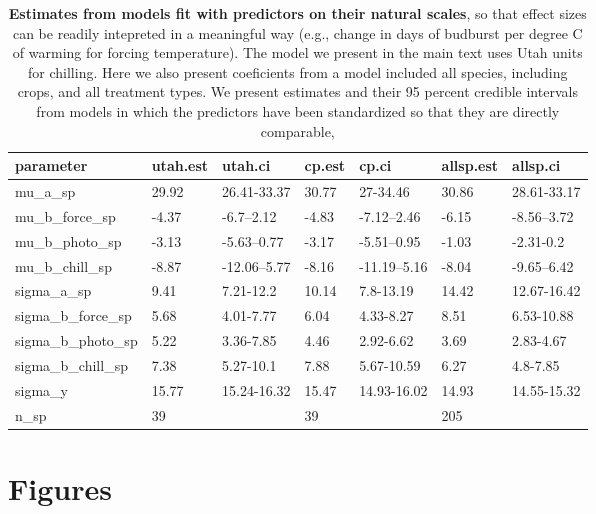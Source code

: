 \documentclass{article}
\begin{document}
\begin{table}[ht]
\centering
\caption{\textbf{Estimates from models fit with predictors on their natural scales},  so that effect sizes can be readily intepreted in a meaningful way (e.g., change in days of budburst per degree C of warming for forcing temperature). The model we present in the main text uses Utah units for chilling. Here we also present coeficients from a model included all species, including crops, and all treatment types. We present estimates and their 95 percent credible intervals from models in which the predictors have been standardized so that they are directly comparable,} 
\label{tab:methods}
\begingroup\footnotesize
\begin{tabular}{|p{}|p{}|p{}|p{}|p{}|p{}|p{}|}
  \hline
parameter & utah.est & utah.ci & cp.est & cp.ci & allsp.est & allsp.ci \\ 
  \hline
mu\_a\_sp & 29.92 & 26.41-33.37 & 30.77 & 27-34.46 & 30.86 & 28.61-33.17 \\ 
  mu\_b\_force\_sp & -4.37 & -6.7--2.12 & -4.83 & -7.12--2.46 & -6.15 & -8.56--3.72 \\ 
  mu\_b\_photo\_sp & -3.13 & -5.63--0.77 & -3.17 & -5.51--0.95 & -1.03 & -2.31-0.2 \\ 
  mu\_b\_chill\_sp & -8.87 & -12.06--5.77 & -8.16 & -11.19--5.16 & -8.04 & -9.65--6.42 \\ 
  sigma\_a\_sp & 9.41 & 7.21-12.2 & 10.14 & 7.8-13.19 & 14.42 & 12.67-16.42 \\ 
  sigma\_b\_force\_sp & 5.68 & 4.01-7.77 & 6.04 & 4.33-8.27 & 8.51 & 6.53-10.88 \\ 
  sigma\_b\_photo\_sp & 5.22 & 3.36-7.85 & 4.46 & 2.92-6.62 & 3.69 & 2.83-4.67 \\ 
  sigma\_b\_chill\_sp & 7.38 & 5.27-10.1 & 7.88 & 5.67-10.59 & 6.27 & 4.8-7.85 \\ 
  sigma\_y & 15.77 & 15.24-16.32 & 15.47 & 14.93-16.02 & 14.93 & 14.55-15.32 \\ 
   \hline
n\_sp & 39 &  & 39 &  & 205 &  \\ 
   \hline
\end{tabular}
\endgroup
\end{table}
% 


\newpage
\section* {Figures}
\end{document}
